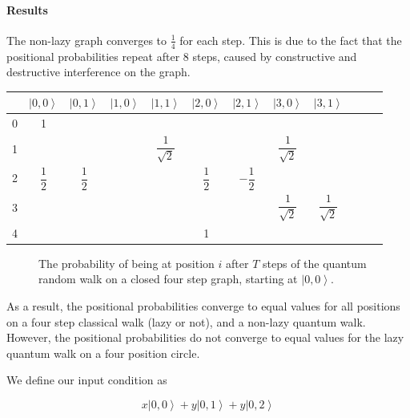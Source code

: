 \documentclass[a0,portrait]{a0poster}
\newcommand{\ket}[1]{\left| #1\right\rangle}
\begin{document}
\begin{center}
{\paragraph{Results}
The non-lazy graph converges to $\frac{1}{4}$ for each step. This is due to the fact that the positional probabilities repeat after 8 steps, caused by constructive and destructive interference on the graph.

\begin{center}
\small
\begin{tabular}{|c||c|c|c|c|c|c|c|c|c|c|c|}
\hline 
& $\ket{0,0}$ & $\ket{0,1}$ & $\ket{1,0}$ & $\ket{1,1}$ & $\ket{2,0}$ & $\ket{2,1}$ & $\ket{3,0}$ & $\ket{3,1}$ \\
\hline \hline
\hspace*{\fill} 0 \hspace*{\fill} & 1  &  &  &  &  &  & & \\
\hline 
1 &  &  &  &  
$\dfrac{ 1 }{ \sqrt{2} }$ & & &
$\dfrac{ 1 }{ \sqrt{2} }$  & 
\hspace*{\fill} \\
\hline 
2 &  
$\dfrac{ 1 }{ 2 }$ & 
$\dfrac{ 1 }{ 2 }$ & & &
$\dfrac{ 1 }{ 2 }$ & 
$-\dfrac{ 1 }{ 2 }$ & & &
\hspace*{\fill} \\
\hline 
3 & & & & & & & 
$\dfrac{ 1 }{ \sqrt{2} }$ & 
$\dfrac{ 1 }{ \sqrt{2} }$
\hspace*{\fill} \\
\hline
\hspace*{\fill} 4 \hspace*{\fill} &  &  &  &  & 1 &  & & \\
\hline 
\end{tabular}
\end{center}

\begin{figure}
\caption{The probability of being at position $i$ after $T$ steps of the quantum random walk on a closed four step graph, starting at $\ket{0,0}$.}
\label{quan_ti}
\end{figure}    

As a result, the positional probabilities converge to equal values for all positions on a four step classical walk (lazy or not), and a non-lazy quantum walk. However, the positional probabilities do not converge to equal values for the lazy quantum walk on a four position circle.

We define our input condition as 

\begin{equation}
x\ket{0,0}+y\ket{0,1}+y\ket{0,2}
\end{equation}

}
\end{center}
\end{document}

